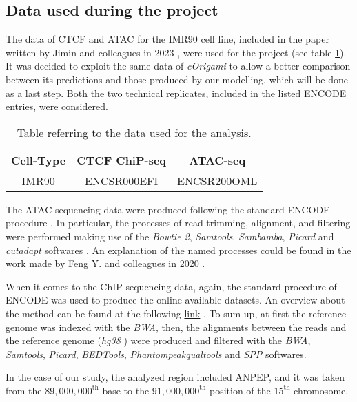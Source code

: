 \subsection{Data used during the project} \label{methods: data used}
The data of CTCF and ATAC for the IMR90 cell line, included in the paper written by Jimin and colleagues in 2023
\cite{tanCelltypespecificPrediction3D2023},
were used for the project (see table \ref{tab:data}). It was decided to exploit the same data of \textit{cOrigami} to allow a better comparison between its predictions and those produced by our modelling, which will be done as a last step. Both the two technical replicates, included in the listed ENCODE
\cite{encodeprojectconsortiumIntegratedEncyclopediaDNA2012} 
entries, were considered.

\begin{table}[H]
    \centering
    \begin{tabular}{|c|c|c|}
        \hline
        \textbf{Cell-Type} & \textbf{CTCF ChiP-seq} & \textbf{ATAC-seq}\\
        \hline
        IMR90 & ENCSR000EFI & ENCSR200OML\\
        \hline
    \end{tabular}
    \caption{Table referring to the data used for the analysis.}
    \label{tab:data}
\end{table}

The ATAC-sequencing data were produced following the standard ENCODE procedure
\cite{ATACseqUnreplicatedENCODE}. 
In particular, the processes of read trimming, alignment, and filtering were performed making use of the \textit{Bowtie 2}, \textit{Samtools}, \textit{Sambamba}, \textit{Picard} and \textit{cutadapt} softwares
\cite{michaelcherryATACSeqPipeline}. 
An explanation of the named processes could be found in the work made by Feng Y. and colleagues in 2020
\cite{yanReadsInsightHitchhiker2020}.

When it comes to the ChIP-sequencing data, again, the standard procedure of ENCODE was used to produce the online available datasets. An overview about the method can be found at the following \href{https://www.encodeproject.org/chip-seq/transcription_factor/}{link}
\cite{TranscriptionFactorChIPseq}.
To sum up, at first the reference genome was indexed with the \textit{BWA}, then, the alignments between the reads and the reference genome (\textit{hg38}
\cite{HomoSapiensGenome})
were produced and filtered with the \textit{BWA}, \textit{Samtools}, \textit{Picard}, \textit{BEDTools}, \textit{Phantompeakqualtools} and \textit{SPP} softwares.


In the case of our study, the analyzed region included ANPEP, and it was taken from the $89,000,000^{\text{th}}$ base to the $91,000,000^{\text{th}}$ position of the $15^{\text{th}}$ chromosome.
